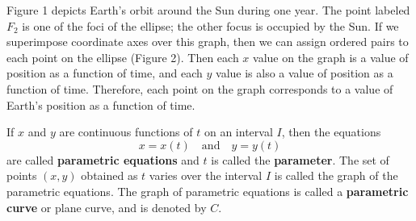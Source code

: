 \documentclass{report}
\begin{document}
    \bigbreak \noindent 
    \begin{minipage}[]{0.47\textwidth}
        Figure 1 depicts Earth’s orbit around the Sun during one year. The point labeled \( F_2 \) is one of the foci of the ellipse; the other focus is occupied by the Sun. If we superimpose coordinate axes over this graph, then we can assign ordered pairs to each point on the ellipse (Figure 2). Then each \( x \) value on the graph is a value of position as a function of time, and each \( y \) value is also a value of position as a function of time. Therefore, each point on the graph corresponds to a value of Earth’s position as a function of time.
    \end{minipage}
    \hspace{.1in}
    \begin{minipage}[]{0.47\textwidth}
    \end{minipage}
    \bigbreak \noindent 
    \begin{dfn}
        If \( x \) and \( y \) are continuous functions of \( t \) on an interval \( I \), then the equations
        \[ x = x(t) \quad \text{and} \quad y = y(t) \]
        are called \textbf{parametric equations} and \( t \) is called the \textbf{parameter}. The set of points \( (x, y) \) obtained as \( t \) varies over the interval \( I \) is called the graph of the parametric equations. The graph of parametric equations is called a \textbf{parametric curve} or plane curve, and is denoted by \( C \).
    \end{dfn}
    \bigbreak \noindent 
    \pagebreak 
\end{document}
